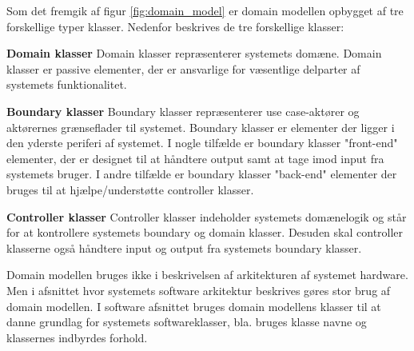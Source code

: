 \newpage

Som det fremgik af figur \ref{fig:domain_model} er domain modellen opbygget af tre forskellige typer klasser. Nedenfor beskrives de tre forskellige klasser:

\textbf{Domain klasser}\newline
Domain klasser repræsenterer systemets domæne. Domain klasser er passive elementer, der er ansvarlige for væsentlige delparter af systemets funktionalitet.  

\textbf{Boundary klasser}\newline
Boundary klasser repræsenterer use case-aktører og aktørernes grænseflader til systemet. Boundary klasser er elementer der ligger i den yderste periferi af systemet. I nogle tilfælde er boundary klasser "front-end" elementer, der er designet til at håndtere output samt at tage imod input fra systemets bruger. I andre tilfælde er boundary klasser "back-end" elementer der bruges til at hjælpe/understøtte controller klasser.

\textbf{Controller klasser} \newline
Controller klasser indeholder systemets domænelogik og står for at kontrollere systemets boundary og domain klasser. Desuden skal controller klasserne også håndtere input og output fra systemets boundary klasser.

\vspace{1cm}

Domain modellen bruges ikke i beskrivelsen af arkitekturen af systemet hardware. Men i afsnittet hvor systemets software arkitektur beskrives gøres stor brug af domain modellen. I software afsnittet bruges domain modellens klasser til at danne grundlag for systemets softwareklasser, bla. bruges klasse navne og klassernes indbyrdes forhold.






